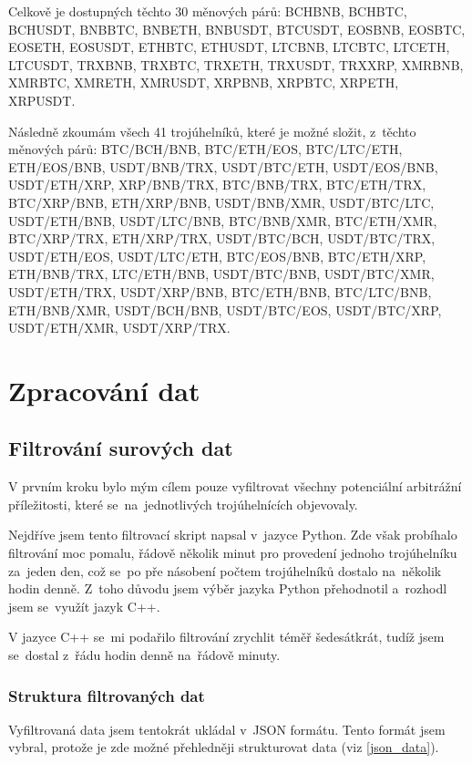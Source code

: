 \documentclass[thesis=B,czech]{FITthesis}[2019/03/21]
\begin{document}
Celkově je dostupných těchto 30 měnových párů: BCHBNB, BCHBTC, BCHUSDT, BNBBTC, BNBETH, BNBUSDT, BTCUSDT, EOSBNB,  \linebreak EOSBTC, EOSETH, EOSUSDT, ETHBTC, ETHUSDT, LTCBNB, LTCBTC, LTCETH, LTCUSDT, TRXBNB, TRXBTC, TRXETH, TRXUSDT,  \linebreak TRXXRP, XMRBNB, XMRBTC, XMRETH, XMRUSDT, XRPBNB,  \linebreak XRPBTC, XRPETH, XRPUSDT.

Následně zkoumám všech 41 trojúhelníků, které je možné složit, z~těchto měnových párů: BTC/BCH/BNB, BTC/ETH/EOS, BTC/LTC/ETH,  \linebreak ETH/EOS/BNB, USDT/BNB/TRX, USDT/BTC/ETH, USDT/EOS/BNB, USDT/ETH/XRP, XRP/BNB/TRX, BTC/BNB/TRX, BTC/ETH/TRX,  \linebreak BTC/XRP/BNB, ETH/XRP/BNB, USDT/BNB/XMR, USDT/BTC/LTC, USDT/ETH/BNB, USDT/LTC/BNB, BTC/BNB/XMR, BTC/ETH/XMR, BTC/XRP/TRX, ETH/XRP/TRX, USDT/BTC/BCH, USDT/BTC/TRX, USDT/ETH/EOS, USDT/LTC/ETH, BTC/EOS/BNB, BTC/ETH/XRP,  \linebreak ETH/BNB/TRX, LTC/ETH/BNB, USDT/BTC/BNB, USDT/BTC/XMR, USDT/ETH/TRX, USDT/XRP/BNB, BTC/ETH/BNB, BTC/LTC/BNB, ETH/BNB/XMR, USDT/BCH/BNB, USDT/BTC/EOS, USDT/BTC/XRP, USDT/ETH/XMR, USDT/XRP/TRX.

\section{Zpracování dat}
\subsection{Filtrování surových dat}
V prvním kroku bylo mým cílem pouze vyfiltrovat všechny potenciální arbitrážní příležitosti, které se~na~jednotlivých trojúhelnících objevovaly.

Nejdříve jsem tento filtrovací skript napsal v~jazyce Python. Zde však probíhalo filtrování moc pomalu, řádově několik minut pro provedení jednoho trojúhelníku za~jeden den, což se~po pře násobení počtem trojúhelníků dostalo na~několik hodin denně. Z~toho důvodu jsem výběr jazyka Python přehodnotil a~rozhodl jsem se~využít jazyk C++. 

V jazyce C++ se~mi podařilo filtrování zrychlit téměř šedesátkrát, tudíž jsem se~dostal z~řádu hodin denně na~řádově minuty.

\subsubsection{Struktura filtrovaných dat}
Vyfiltrovaná data jsem  tentokrát ukládal v~JSON formátu. Tento formát jsem vybral, protože je zde možné přehledněji strukturovat data (viz \ref{json_data}).
\end{document}
